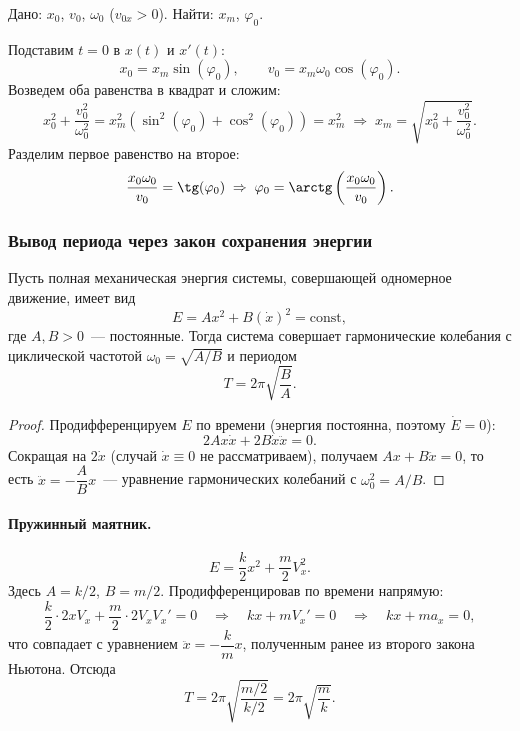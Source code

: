 \documentclass[12pt]{article}
\begin{document}
    \begin{problem}
    	Дано: $x_0$, $v_0$, $\omega_0$ ($v_{0x} > 0$). Найти: $x_m$, $\varphi_0$.
    \end{problem}
    
    \begin{solution}
    	Подставим $t = 0$ в $x(t)$ и $x'(t)$:
    	$$x_0 = x_m \sin (\varphi_0), \qquad v_0 = x_m \omega_0 \cos (\varphi_0).$$
    	Возведем оба равенства в квадрат и сложим:
    	$$x_0^2 + \frac{v_0^2}{\omega_0^2} = x_m^2(\sin^2(\varphi_0) + \cos^2(\varphi_0)) = x_m^2 \; \Rightarrow \; x_m = \sqrt{x_0^2 + \frac{v_0^2}{\omega_0^2}}.$$
    	Разделим первое равенство на второе:
    	$$\frac{x_0 \omega_0}{v_0} = \tg (\varphi_0) \; \Rightarrow \; \varphi_0 = \arctg \left( \frac{x_0 \omega_0}{v_0} \right).$$
    \end{solution}

	\subsubsection{Вывод периода через закон сохранения энергии}

	\begin{statement}
		Пусть полная механическая энергия системы, совершающей одномерное движение, имеет вид
		\[
			E = Ax^2 + B(\dot x)^2 = \mathrm{const},
		\]
		где $A, B > 0$~--- постоянные. Тогда система совершает гармонические колебания с циклической частотой $\omega_0 = \sqrt{A/B}$ и периодом
		\[
			T = 2\pi\sqrt{\frac{B}{A}}.
		\]
	\end{statement}
	\begin{proof}
		Продифференцируем $E$ по времени (энергия постоянна, поэтому $\dot E = 0$):
		\[
			2Ax\dot x + 2B\dot x\ddot x = 0.
		\]
		Сокращая на $2\dot x$ (случай $\dot x \equiv 0$ не рассматриваем), получаем $Ax + B\ddot x = 0$, то есть $\ddot x = -\dfrac{A}{B}x$~--- уравнение гармонических колебаний с $\omega_0^2 = A/B$.
	\end{proof}

	\paragraph{Пружинный маятник.}
	\[
		E = \frac{k}{2}x^2 + \frac{m}{2}V_x^2.
	\]
	Здесь $A = k/2$, $B = m/2$. Продифференцировав по времени напрямую:
	\[
		\frac{k}{2}\cdot 2xV_x + \frac{m}{2}\cdot 2V_xV_x' = 0 \quad \Longrightarrow \quad kx + mV_x' = 0 \quad \Longrightarrow \quad kx + ma_x = 0,
	\]
	что совпадает с уравнением $\ddot x = -\dfrac{k}{m}x$, полученным ранее из второго закона Ньютона. Отсюда
	\[
		T = 2\pi\sqrt{\frac{m/2}{k/2}} = 2\pi\sqrt{\frac{m}{k}}.
	\]
\end{document}
